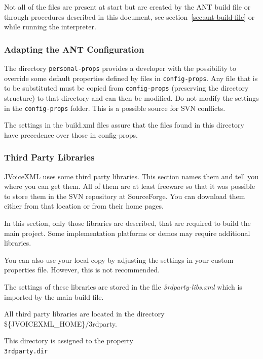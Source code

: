 \documentclass[11pt,a4paper]{article}
\begin{document}
Not all of the files are present at start but are created by the
ANT build file or through procedures described in this 
document, see section~\ref{sec:ant-build-file} or while running the interpreter.

\subsubsection{Adapting the ANT Configuration}
\label{sec:adapt-ant}

The directory \texttt{personal-props} provides a developer with the 
possibility to override some 
default properties defined by files in \texttt{config-props}. 
Any file that is to be
substituted must be copied from \texttt{config-props} 
(preserving the directory structure) to that directory and can then be 
modified. Do not modify the settings in the \texttt{config-props} folder. This
is a possible source for SVN conflicts.

The settings in the build.xml files assure that the files
found in this directory have precedence over those in config-props.

\subsubsection{Third Party Libraries}
\label{sec:third-party-libr}

JVoiceXML uses some third party libraries. This section names them and tell
you where you can get them. All of them are at least freeware
so that it was possible to store them in the SVN repository at
SourceForge. You can download them either from that location or
from their home pages. 

In this section, only those libraries are described, that are required
to build the main project. Some implementation platforms or demos may
require additional libraries.

You can also use your local copy by adjusting the settings in your
custom properties file. However, this is not recommended.

The settings of these libraries are stored in the file \emph{3rdparty-libs.xml}
which is imported by the main build file.

All third party libraries are located in the directory \\
\$\{JVOICEXML\_HOME\}/3rdparty.

This directory is assigned to the property \\
\texttt{3rdparty.dir}
\end{document}

